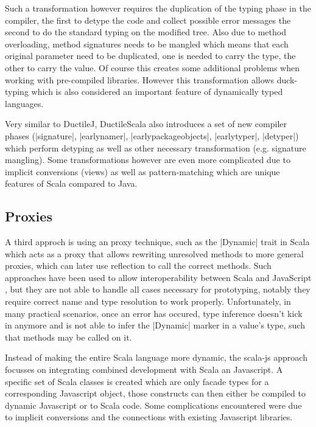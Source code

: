 Such a transformation however requires the duplication of the typing phase in the compiler, the first to detype the code and collect possible error messages the second to do the standard typing on the modified tree. Also due to method overloading, method signatures needs to be mangled which means that each original parameter need to be duplicated, one is needed to carry the type, the other to carry the value. Of course this creates some additional problems when working with pre-compiled libraries. However this transformation allows duck-typing which is also considered an important feature of dynamically typed languages.

Very similar to DuctileJ, DuctileScala \cite{ductilescala} also introduces a set of new compiler phases (|signature|, |earlynamer|, |earlypackageobjects|, |earlytyper|, |detyper|) which perform detyping as well as other necessary transformation (e.g. signature mangling). Some transformations however are even more complicated due to implicit conversions (views) as well as pattern-matching which are unique features of Scala compared to Java.

\subsection{Proxies}

A third approch is using an proxy technique, such as the |Dynamic| trait in Scala \cite{dynamic} which acts as a proxy that allows rewriting unresolved methods to more general proxies, which can later use reflection to call the correct methods. Such approaches have been used to allow interoperability between Scala and JavaScript \cite{scala-js}, but they are not able to handle all cases necessary for prototyping, notably they require correct name and type resolution to work properly. Unfortunately, in many practical scenarios, once an error has occured, type inference doesn't kick in anymore and is not able to infer the |Dynamic| marker in a value's type, such that methods may be called on it.

Instead of making the entire Scala language more dynamic, the scala-js approach \cite{scala-js} focusses on integrating combined development with Scala an Javascript. A specific set of Scala classes is created which are only facade types for a corresponding Javascript object, those constructs can then either be compiled to dynamic Javascript or to Scala code. Some complications encountered were due to implicit conversions and the connections with existing Javascript libraries.

